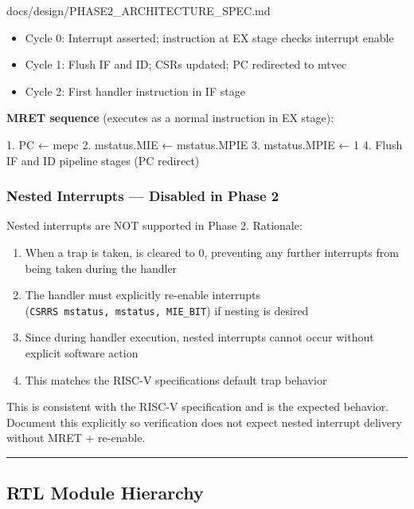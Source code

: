 \begin{relocated}{docs/design/PHASE2_ARCHITECTURE_SPEC.md}
\begin{itemize}
\tightlist
\item
  Cycle 0: Interrupt asserted; instruction at EX stage checks interrupt
  enable
\item
  Cycle 1: Flush IF and ID; CSRs updated; PC redirected to mtvec
\item
  Cycle 2: First handler instruction in IF stage
\end{itemize}

\textbf{MRET sequence} (executes as a normal instruction in EX stage):

\begin{textblock}
1. PC ← mepc
2. mstatus.MIE ← mstatus.MPIE
3. mstatus.MPIE ← 1
4. Flush IF and ID pipeline stages (PC redirect)
\end{textblock}

\subsubsection{Nested Interrupts --- Disabled in Phase 2}\label{ds:ch:phase2-architecture:46-nested-interrupts-disabled-in-phase-2}

Nested interrupts are NOT supported in Phase 2. Rationale:

\begin{enumerate}
\def\labelenumi{\arabic{enumi}.}
\tightlist
\item
  When a trap is taken,  is cleared to 0, preventing
  any further interrupts from being taken during the handler
\item
  The handler must explicitly re-enable interrupts
  (\texttt{CSRRS\ mstatus,\allowbreak{}\ mstatus,\allowbreak{}\ MIE\_\allowbreak{}BIT})
  if nesting is desired
\item
  Since  during handler execution, nested interrupts cannot
  occur without explicit software action
\item
  This matches the RISC-V specification\textquotesingle s default trap
  behavior
\end{enumerate}

This is consistent with the RISC-V specification and is the expected
behavior. Document this explicitly so verification does not expect
nested interrupt delivery without MRET + re-enable.

\begin{center}\rule{0.5\linewidth}{0.5pt}\end{center}

\subsection{RTL Module Hierarchy}\label{ds:ch:phase2-architecture:5-rtl-module-hierarchy}


\end{relocated}
